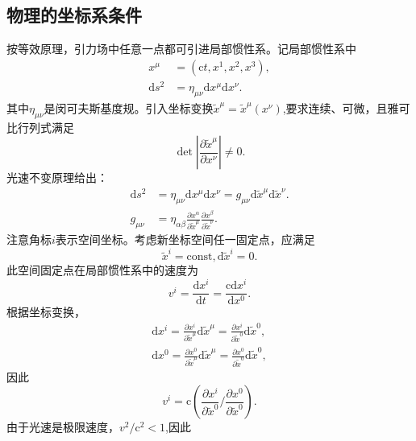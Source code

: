 \documentclass[11pt, a4paper, oneside, onecolumn]{ctexart}
\numberwithin{equation}{subsection}
\begin{document}
\subsection{物理的坐标系条件}
按等效原理，引力场中任意一点都可引进局部惯性系。记局部惯性系中
\begin{align}
x^{\mu}&=\left(\mathrm{c}t,x^{1},x^{2},x^{3}\right),\\
\mathrm{d}s^{2}&=\eta_{\mu\nu}\mathrm{d}x^{\mu}\mathrm{d}x^{\nu}.
\end{align}
其中$\eta_{\mu\nu}$是闵可夫斯基度规。引入坐标变换$\widetilde{x}^{\mu}=\widetilde{x}^{\mu}\left(x^{\nu}\right)$,要求连续、可微，且雅可比行列式满足
\begin{equation}
\det\left\vert{}\frac{\partial{}\widetilde{x}^{\mu}}{\partial{}x^{\nu}}\right\vert{}\ne0.
\end{equation}
光速不变原理给出：
\begin{align}
\mathrm{d}s^{2}&=\eta_{\mu\nu}\mathrm{d}x^{\mu}\mathrm{d}x^{\nu}=g_{\mu\nu}\mathrm{d}\widetilde{x}^{\mu}\mathrm{d}\widetilde{x}^{\nu}.\\
g_{\mu\nu}&=\eta_{\alpha\beta}\frac{\partial{}x^{\alpha}}{\partial{}\widetilde{x}^{\mu}}\frac{\partial{}x^{\beta}}{\partial{}\widetilde{x}^{\nu}}.
\end{align}
注意角标${i}$表示空间坐标。考虑新坐标空间任一固定点，应满足
\begin{equation}
\widetilde{x}^{i}=\text{const},\mathrm{d}\widetilde{x}^{i}=0.
\end{equation}
此空间固定点在局部惯性系中的速度为
\begin{equation}
v^{i}=\frac{\mathrm{d}x^{i}}{\mathrm{d}t}=\frac{\mathrm{c}\mathrm{d}x^{i}}{\mathrm{d}x^{0}}.
\end{equation}
根据坐标变换，
\begin{align}
\mathrm{d}x^{i}=\frac{\partial{}x^{i}}{\partial{}\widetilde{x}^{\mu}}\mathrm{d}\widetilde{x}^{\mu}=\frac{\partial{}x^{i}}{\partial{}\widetilde{x}^{0}}\mathrm{d}\widetilde{x}^{0},\\
\mathrm{d}x^{0}=\frac{\partial{}x^{0}}{\partial{}\widetilde{x}^{\mu}}\mathrm{d}\widetilde{x}^{\mu}=\frac{\partial{}x^{0}}{\partial{}\widetilde{x}^{0}}\mathrm{d}\widetilde{x}^{0},
\end{align}
因此
\begin{equation}
v^{i}=\mathrm{c}\left(\frac{\partial{}x^{i}}{\partial{}\widetilde{x}^{0}}/\frac{\partial{}x^{0}}{\partial{}\widetilde{x}^{0}}\right).
\end{equation}
由于光速是极限速度，$v^{2}/\mathrm{c}^{2}<1$,因此
\end{document}
